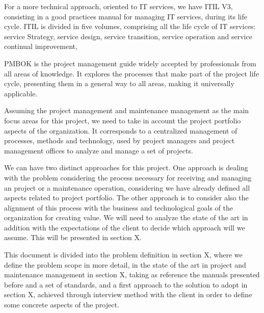For a more technical approach, oriented to IT services, we have ITIL V3, consisting in a good practices manual for managing IT services, during its life cycle. ITIL is divided in five volumes, comprising all the life cycle of IT services: service Strategy, service design, service transition, service operation and service continual improvement,\par
PMBOK is the project management guide widely accepted by professionals from all areas of knowledge. It explores the processes that make part of the project life cycle, presenting them in a general way to all areas, making it universally applicable.\par
Assuming the project management and maintenance management as the main focus areas for this project, we need to take in account the project portfolio aspects of the organization. It corresponds to a centralized management of processes, methods and technology, used by project managers and project management offices to analyze and manage a set of projects.\par
We can have two distinct approaches for this project. One approach is dealing with the problem considering the process necessary for receiving and managing an project or a maintenance operation, considering we have already defined all aspects related to project portfolio. The other approach is to consider also the alignment of this process with the business and technological goals of the organization for creating value. We will need to analyze the state of the art in addition with the expectations of the client to decide which approach will we assume. This will be presented in section X.\par
This document is divided into the problem definition in section X, where we define the problem scope in more detail, in the state of the art in project and maintenance management in section X, taking as reference the manuals presented before and a set of standards, and a first approach to the solution to adopt in section X,  achieved through interview method with the client in order to define some concrete aspects of the project.